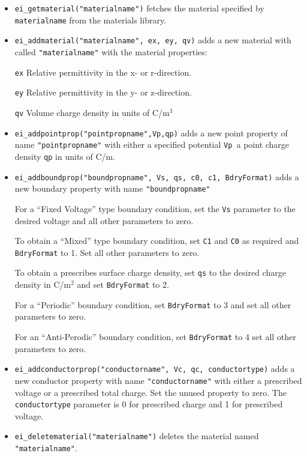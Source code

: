 \begin{itemize}
\item \texttt{ei\_getmaterial("materialname")} fetches the material specified by \texttt{materialname} 
from the materials library.

\item \texttt{ei\_addmaterial("materialname", ex, ey, qv)} adds a new material with
called \texttt{"materialname"} with the material properties:

\texttt{ex} Relative permittivity in the x- or r-direction.

\texttt{ey} Relative permittivity in the y- or z-direction.

\texttt{qv} Volume charge density in units of C/m$^{3}$

\item \texttt{ei\_addpointprop("pointpropname",Vp,qp)} adds a new point property of
name \texttt{"pointpropname"} with either a specified potential
\texttt{Vp }a point charge density \texttt{qp} in units of C/m.

\item \texttt{ei\_addboundprop("boundpropname", Vs, qs, c0, c1, BdryFormat)} adds a
new boundary property with name \texttt{"boundpropname"}

For a ``Fixed Voltage'' type boundary condition, set the
\texttt{Vs} parameter to the desired voltage and all other
parameters to zero.

To obtain a ``Mixed'' type boundary condition, set \texttt{C1} and
\texttt{C0} as required and \texttt{BdryFormat} to 1. Set all other
parameters to zero.

To obtain a prescribes surface charge density, set \texttt{qs} to
the desired charge density in C/m$^{2}$ and set \texttt{BdryFormat}
to 2.

For a ``Periodic'' boundary condition, set \texttt{BdryFormat} to 3
and set all other parameters to zero.

For an ``Anti-Perodic'' boundary condition, set \texttt{BdryFormat}
to 4 set all other parameters to zero.

\item \texttt{ei\_addconductorprop("conductorname", Vc, qc, conductortype)} adds a new
conductor property with name \texttt{"conductorname"} with either a
prescribed voltage or a prescribed total charge. Set the unused
property to zero. The \texttt{conductortype} parameter is 0 for
prescribed charge and 1 for prescribed voltage.

\item \texttt{ei\_deletematerial("materialname")} deletes the material named
\texttt{"materialname"}.


\end{itemize}
